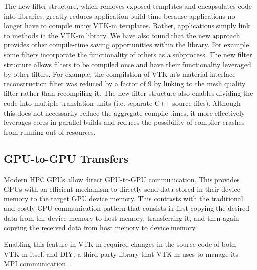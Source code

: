 The new filter structure, which removes exposed templates and encapsulates code into libraries, greatly reduces application build time because applications no longer have to compile many VTK-m templates.
Rather, applications simply link to methods in the VTK-m library.
We have also found that the new approach provides other compile-time saving opportunities within the library.
For example, some filters incorporate the functionality of others as a subprocess. 
The new filter structure allows filters to be compiled once and have their functionality leveraged by other filters.
For example, the compilation of VTK-m's material interface reconstruction filter was reduced by a factor of 9 by linking to the mesh quality filter rather than recompiling it.
The new filter structure also enables dividing the code into multiple translation units (i.e. separate C++ source files).
Although this does not necessarily reduce the aggregate compile times, it more effectively leverages cores in parallel builds and reduces the possibility of compiler crashes from running out of resources.

\subsection{GPU-to-GPU Transfers}

Modern HPC GPUs allow direct GPU-to-GPU communication. This provides GPUs with an efficient mechanism to directly send data stored in their device memory to the target GPU device memory. This contrasts with the traditional and costly GPU communication pattern that consists in first copying the desired data from the device memory to host memory, transferring it, and then again copying the received data from host memory to device memory.

Enabling this feature in VTK-m required changes in the source code of both VTK-m itself and DIY, a third-party library that VTK-m uses to manage its MPI communication~\cite{Peterka2011,Morozov2016}.

